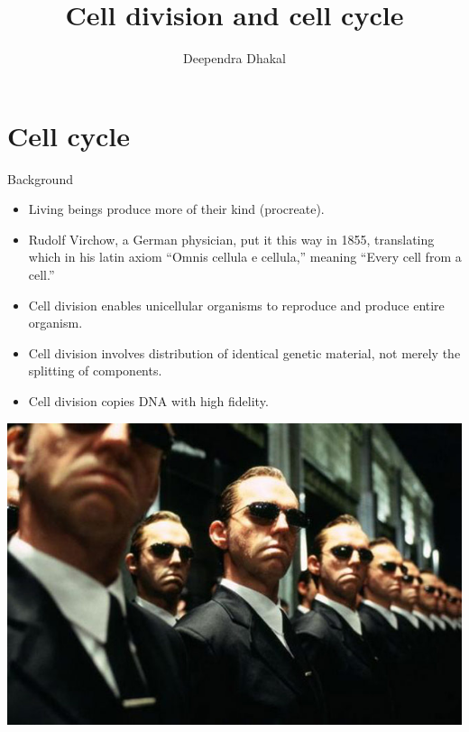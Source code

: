 \documentclass[11pt,ignorenonframetext,aspectratio=169]{beamer}
\title[]{Cell division and cell cycle}
\author[
        Deependra Dhakal
    ]{Deependra Dhakal}
\institute[
    ]{
    Agriculture and Forestry University\\
\textit{ddhakal.rookie@gmail.com}\\
\url{https://rookie.rbind.io}
    }
\date[
      
  ]{
    }
\providecommand{\tightlist}{%
  \setlength{\itemsep}{0pt}\setlength{\parskip}{0pt}}
\begin{document}
  \begin{frame}[plain]
  \titlepage
  \end{frame}



\hypertarget{cell-cycle}{%
\section{Cell cycle}\label{cell-cycle}}

\begin{frame}{Background}
\protect\hypertarget{background}{}
\small

\begin{itemize}
\tightlist
\item
  Living beings produce more of their kind (procreate).
\item
  Rudolf Virchow, a German physician, put it this way in 1855,
  translating which in his latin axiom ``Omnis cellula e cellula,''
  meaning ``Every cell from a cell.''
\item
  Cell division enables unicellular organisms to reproduce and produce
  entire organism.
\item
  Cell division involves distribution of identical genetic material, not
  merely the splitting of components.
\item
  Cell division copies DNA with high fidelity.
\end{itemize}

\begin{center}\includegraphics[width=0.38\linewidth]{../images/agent_smith} \end{center}
\end{frame}
\end{document}
